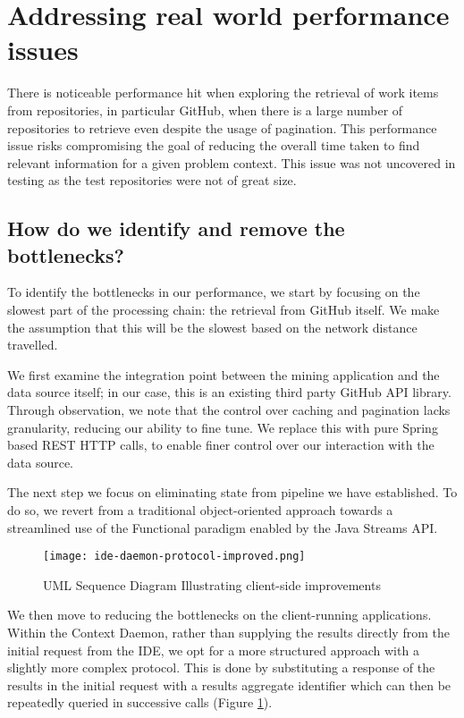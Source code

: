 \section{Addressing real world performance issues}

There is noticeable performance hit when exploring the retrieval of work items from repositories, in particular GitHub, when there is a large number of repositories to retrieve even despite the usage of pagination. This performance issue risks compromising the goal of reducing the overall time taken to find relevant information for a given problem context. This issue was not uncovered in testing as the test repositories were not of great size.

\subsection{How do we identify and remove the bottlenecks?}

To identify the bottlenecks in our performance, we start by focusing on the slowest part of the processing chain: the retrieval from GitHub itself. We make the assumption that this will be the slowest based on the network distance travelled.

We first examine the integration point between the mining application and the data source itself; in our case, this is an existing third party GitHub API library. Through observation, we note that the control over caching and pagination lacks granularity, reducing our ability to fine tune. We replace this with pure Spring based REST HTTP calls, to enable finer control over our interaction with the data source.

The next step we focus on eliminating state from pipeline we have established. To do so, we revert from a traditional object-oriented approach towards a streamlined use of the Functional paradigm enabled by the Java Streams API.


\begin{figure}[h!]
	\centering
	\texttt{[image: ide-daemon-protocol-improved.png]}
	\caption{UML Sequence Diagram Illustrating client-side improvements}
	\label{fig:ideDaemonProtocolImproved}
\end{figure}

We then move to reducing the bottlenecks on the client-running applications. Within the Context Daemon, rather than supplying the results directly from the initial request from the IDE, we opt for a more structured approach with a slightly more complex protocol. This is done by substituting a response of the results in the initial request with a results aggregate identifier which can then be repeatedly queried in successive calls (Figure \ref{fig:ideDaemonProtocolImproved}).

